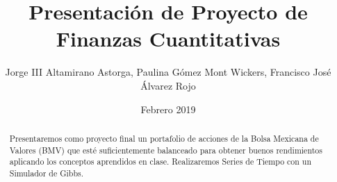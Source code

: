 \documentclass[12pt,reqno,a4paper]{article}
\begin{document}
	\title{ Presentaci\'on de Proyecto de Finanzas Cuantitativas}
	\author{Jorge III Altamirano Astorga, Paulina G\'omez Mont Wickers, Francisco Jos\'e \'Alvarez Rojo}
	\date{Febrero 2019}
	\maketitle
	
	\begin{abstract}
		Presentaremos como proyecto final un 	portafolio de acciones de la Bolsa Mexicana de Valores (BMV) que est\'e suficientemente balanceado para obtener buenos rendimientos aplicando los conceptos aprendidos en clase. Realizaremos Series de Tiempo con un Simulador de Gibbs.
	\end{abstract}
\end{document}

